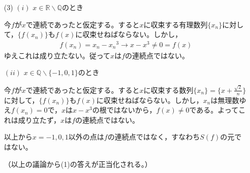 \documentclass[a4paper,12pt,dvipdfmx,fleqn, oneside]{jsarticle}
\theoremstyle{defstyle}
\theoremstyle{thmx}
\theoremstyle{qesstyle}
\begin{document}
\begin{screen}
    \begin{enumerate}
        \item[(3)] $(i)$ $x \in \mathbb{R}\backslash \mathbb{Q}$のとき

            今$f$が$x$で連続であったと仮定する。すると$x$に収束する有理数列$\{x_n\}$に対して，$\{f(x_n)\}$も$f(x)$に収束せねばならない。しかし，
            \begin{align*}
                f(x_n) = x_n- {x_n}^3 \to x - x^3 \neq 0 = f(x)
            \end{align*}
            ゆえこれは成り立たない。従って$x$は$f$の連続点ではない。

            $(ii)$ $x \in \mathbb{Q} \backslash \{-1,0,1\}$のとき

            今$f$が$x$で連続であったと仮定する。すると$x$に収束する数列$\{x_n\}=\Big\{x + \frac{\sqrt{2}}{n}\Big\}$に対して，$\{f(x_n)\}$も$f(x)$に収束せねばならない。しかし，$x_n$は無理数ゆえ$f(x_n)=0$で，$x$は$x-x^3$の根ではないから，$f(x)\neq 0 $である。よってこれは成り立たず，$x$は$f$の連続点ではない。

            以上から$x=-1,0,1$以外の点は$f$の連続点ではなく，すなわち$S(f)$の元ではない。

            （以上の議論から(1)の答えが正当化される。）
    \end{enumerate}
\end{screen}
\end{document}

